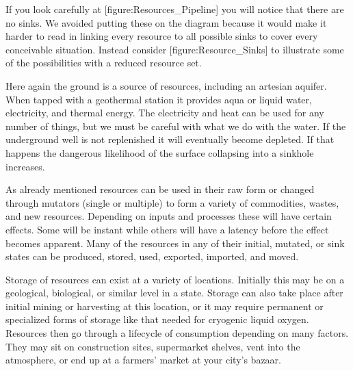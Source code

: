 If you look carefully at [figure:Resources_Pipeline] you will notice that there are no sinks. We avoided putting these on the diagram because it would make it harder to read in linking every resource to all possible sinks to cover every conceivable situation. Instead consider [figure:Resource_Sinks] to illustrate some of the possibilities with a reduced resource set.

    {}

Here again the ground is a source of resources, including an artesian aquifer. When tapped with a geothermal station it provides aqua or liquid water, electricity, and thermal energy. The electricity and heat can be used for any number of things, but we must be careful with what we do with the water. If the underground well is not replenished it will eventually become depleted. If that happens the dangerous likelihood of the surface collapsing into a sinkhole increases.

As already mentioned resources can be used in their raw form or changed through mutators (single or multiple) to form a variety of commodities, wastes, and new resources. Depending on inputs and processes these will have certain effects. Some will be instant while others will have a latency before the effect becomes apparent. Many of the resources in any of their initial, mutated, or sink states can be produced, stored, used, exported, imported, and moved.

Storage of resources can exist at a variety of locations. Initially this may be on a geological, biological, or similar level in a  state. Storage can also take place after initial mining or harvesting at this location, or it may require permanent or specialized forms of storage like that needed for cryogenic liquid oxygen. Resources then go through a lifecycle of consumption depending on many factors. They may sit on construction sites, supermarket shelves, vent into the atmosphere, or end up at a farmers' market at your city's bazaar.


